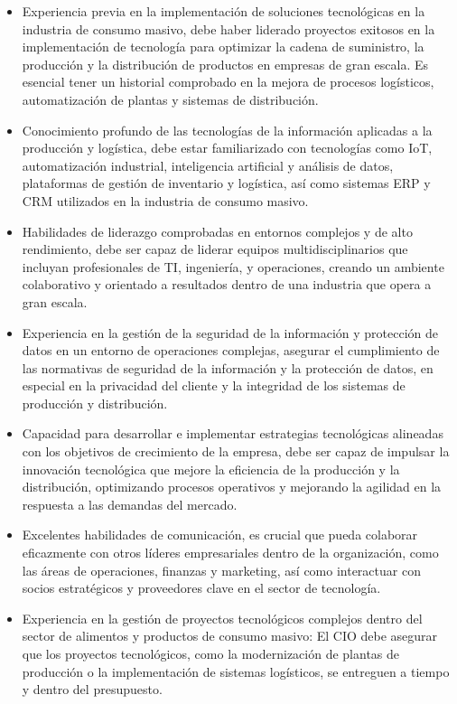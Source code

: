         \begin{itemize}
            \item Experiencia previa en la implementación de soluciones tecnológicas en la industria de consumo masivo, debe haber liderado proyectos exitosos en la implementación de tecnología para optimizar la cadena de suministro, la producción y la distribución de productos en empresas de gran escala. Es esencial tener un historial comprobado en la mejora de procesos logísticos, automatización de plantas y sistemas de distribución. 
            \item Conocimiento profundo de las tecnologías de la información aplicadas a la producción y logística, debe estar familiarizado con tecnologías como IoT, automatización industrial, inteligencia artificial y análisis de datos, plataformas de gestión de inventario y logística, así como sistemas ERP y CRM utilizados en la industria de consumo masivo. 
            \item Habilidades de liderazgo comprobadas en entornos complejos y de alto rendimiento, debe ser capaz de liderar equipos multidisciplinarios que incluyan profesionales de TI, ingeniería, y operaciones, creando un ambiente colaborativo y orientado a resultados dentro de una industria que opera a gran escala. 
            \item Experiencia en la gestión de la seguridad de la información y protección de datos en un entorno de operaciones complejas, asegurar el cumplimiento de las normativas de seguridad de la información y la protección de datos, en especial en la privacidad del cliente y la integridad de los sistemas de producción y distribución. 
            \item Capacidad para desarrollar e implementar estrategias tecnológicas alineadas con los objetivos de crecimiento de la empresa, debe ser capaz de impulsar la innovación tecnológica que mejore la eficiencia de la producción y la distribución, optimizando procesos operativos y mejorando la agilidad en la respuesta a las demandas del mercado. 
            \item Excelentes habilidades de comunicación, es crucial que pueda colaborar eficazmente con otros líderes empresariales dentro de la organización, como las áreas de operaciones, finanzas y marketing, así como interactuar con socios estratégicos y proveedores clave en el sector de tecnología. 
            \item Experiencia en la gestión de proyectos tecnológicos complejos dentro del sector de alimentos y productos de consumo masivo: El CIO debe asegurar que los proyectos tecnológicos, como la modernización de plantas de producción o la implementación de sistemas logísticos, se entreguen a tiempo y dentro del presupuesto. 

\end{itemize}
